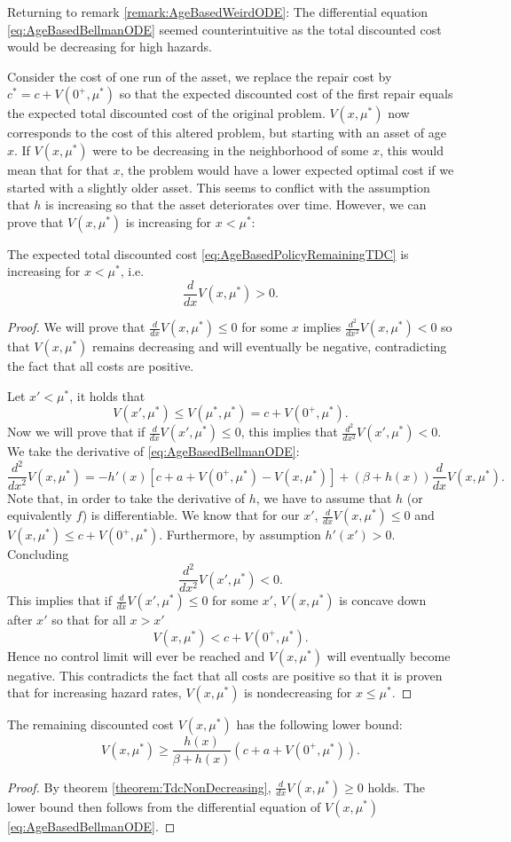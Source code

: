 	Returning to remark \ref{remark:AgeBasedWeirdODE}:
	The differential equation \eqref{eq:AgeBasedBellmanODE} seemed counterintuitive as the total discounted cost would be decreasing for high hazards.
	
	Consider the cost of one run of the asset, we replace the repair cost by $c^*=c+V(0^+,\mu^*)$ so that the expected discounted cost of the first repair equals the expected total discounted cost of the original problem.
	$V(x,\mu^*)$ now corresponds to the cost of this altered problem, but starting with an asset of age $x$.
	If $V(x,\mu^*)$ were to be decreasing in the neighborhood of some $x$, this would mean that for that $x$, the problem would have a lower expected optimal cost if we started with a slightly older asset.
	This seems to conflict with the assumption that $h$ is increasing so that the asset deteriorates over time.
	However, we can prove that $V(x,\mu^*)$ is increasing for $x<\mu^*$:

\begin{theorem}\label{theorem:TdcNonDecreasing}
	The expected total discounted cost \eqref{eq:AgeBasedPolicyRemainingTDC} is increasing for $x< \mu^*$, i.e.
	\[
	\frac{d}{dx}V(x,\mu^*)> 0.
	\]
	\begin{proof}
		We will prove that $\frac{d}{dx}V(x,\mu^*)\leq0$ for some $x$ implies $\frac{d^2}{dx^2}V(x,\mu^*)<0$ so that $V(x,\mu^*)$ remains decreasing and will eventually be negative, contradicting the fact that all costs are positive.
		
		Let $x'<\mu^*$, it holds that
		\[
		V(x',\mu^*)\leq V(\mu^*,\mu^*)=c+V(0^+,\mu^*).
		\]
		Now we will prove that if $\frac{d}{dx}V(x',\mu^*)\leq 0$, this implies that $\frac{d^2}{dx^2}V(x',\mu^*)<0$.
		We take the derivative of \eqref{eq:AgeBasedBellmanODE}:
		\[
		\frac{d^2}{dx^2}V(x,\mu^*)=-h'(x)[c+a+V(0^+,\mu^*)-V(x,\mu^*)]+(\beta+h(x))\frac{d}{dx}V(x,\mu^*).
		\]
		Note that, in order to take the derivative of $h$, we have to assume that $h$ (or equivalently $f$) is differentiable.
		We know that for our $x'$, $\frac{d}{dx}V(x,\mu^*)\leq 0$ and $V(x,\mu^*)\leq c+V(0^+,\mu^*)$.
		Furthermore, by assumption $h'(x')>0$.
		Concluding
		\[
		\frac{d^2}{dx^2}V(x',\mu^*)<0.
		\]
		This implies that if $\frac{d}{dx}V(x',\mu^*)\leq0$ for some $x'$, $V(x,\mu^*)$ is concave down after $x'$ so that for all $x>x'$
		\[
		V(x,\mu^*)< c+V(0^+,\mu^*).
		\]
		Hence no control limit will ever be reached and $V(x,\mu^*)$ will eventually become negative.
		This contradicts the fact that all costs are positive so that it is proven that for increasing hazard rates, $V(x,\mu^*)$ is nondecreasing for $x\leq\mu^*$.
	\end{proof}
\end{theorem}

\begin{corollary}
	The remaining discounted cost $V(x,\mu^*)$ has the following lower bound:
	\[
	V(x,\mu^*)\geq\frac{h(x)}{\beta+ h(x)}(c+a+ V(0^+,\mu^*)).
	\]
	\begin{proof}
		By theorem \ref{theorem:TdcNonDecreasing}, $\frac{d}{dx}V(x,\mu^*)\geq 0$ holds.
		The lower bound then follows from the differential equation of $V(x,\mu^*)$ \ref{eq:AgeBasedBellmanODE}.
	\end{proof}
\end{corollary}